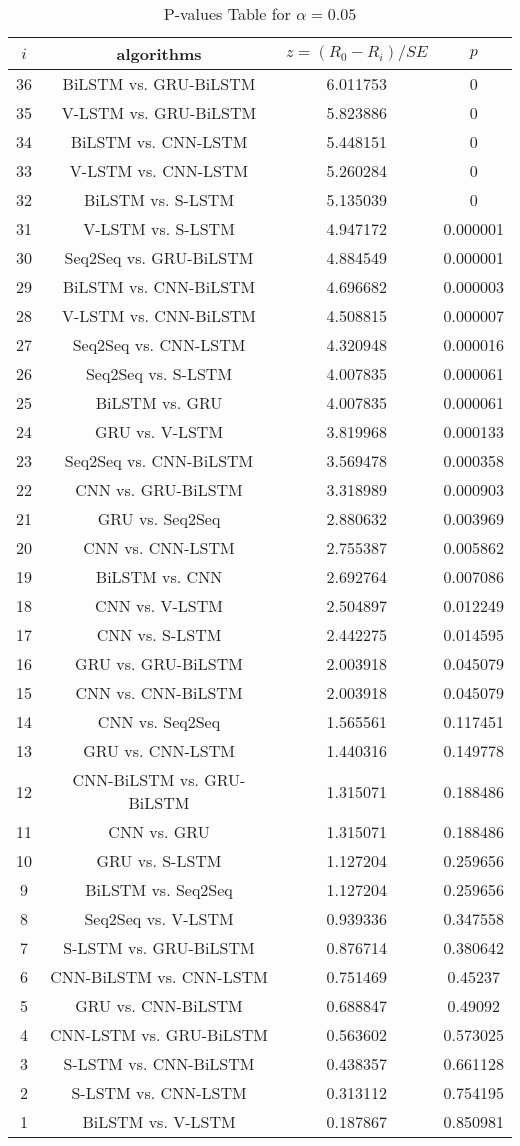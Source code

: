 \documentclass[a4paper,10pt]{article}
\begin{document}
\begin{landscape}
\begin{table}[!htp]
\centering\scriptsize
\begin{tabular}{cccc}
$i$&algorithms&$z=(R_0 - R_i)/SE$&$p$\\
\hline36&BiLSTM vs. GRU-BiLSTM&6.011753&0\\
35&V-LSTM vs. GRU-BiLSTM&5.823886&0\\
34&BiLSTM vs. CNN-LSTM&5.448151&0\\
33&V-LSTM vs. CNN-LSTM&5.260284&0\\
32&BiLSTM vs. S-LSTM&5.135039&0\\
31&V-LSTM vs. S-LSTM&4.947172&0.000001\\
30&Seq2Seq vs. GRU-BiLSTM&4.884549&0.000001\\
29&BiLSTM vs. CNN-BiLSTM&4.696682&0.000003\\
28&V-LSTM vs. CNN-BiLSTM&4.508815&0.000007\\
27&Seq2Seq vs. CNN-LSTM&4.320948&0.000016\\
26&Seq2Seq vs. S-LSTM&4.007835&0.000061\\
25&BiLSTM vs. GRU&4.007835&0.000061\\
24&GRU vs. V-LSTM&3.819968&0.000133\\
23&Seq2Seq vs. CNN-BiLSTM&3.569478&0.000358\\
22&CNN vs. GRU-BiLSTM&3.318989&0.000903\\
21&GRU vs. Seq2Seq&2.880632&0.003969\\
20&CNN vs. CNN-LSTM&2.755387&0.005862\\
19&BiLSTM vs. CNN&2.692764&0.007086\\
18&CNN vs. V-LSTM&2.504897&0.012249\\
17&CNN vs. S-LSTM&2.442275&0.014595\\
16&GRU vs. GRU-BiLSTM&2.003918&0.045079\\
15&CNN vs. CNN-BiLSTM&2.003918&0.045079\\
14&CNN vs. Seq2Seq&1.565561&0.117451\\
13&GRU vs. CNN-LSTM&1.440316&0.149778\\
12&CNN-BiLSTM vs. GRU-BiLSTM&1.315071&0.188486\\
11&CNN vs. GRU&1.315071&0.188486\\
10&GRU vs. S-LSTM&1.127204&0.259656\\
9&BiLSTM vs. Seq2Seq&1.127204&0.259656\\
8&Seq2Seq vs. V-LSTM&0.939336&0.347558\\
7&S-LSTM vs. GRU-BiLSTM&0.876714&0.380642\\
6&CNN-BiLSTM vs. CNN-LSTM&0.751469&0.45237\\
5&GRU vs. CNN-BiLSTM&0.688847&0.49092\\
4&CNN-LSTM vs. GRU-BiLSTM&0.563602&0.573025\\
3&S-LSTM vs. CNN-BiLSTM&0.438357&0.661128\\
2&S-LSTM vs. CNN-LSTM&0.313112&0.754195\\
1&BiLSTM vs. V-LSTM&0.187867&0.850981\\
\hline
\end{tabular}
\caption{P-values Table for $\alpha=0.05$}
\end{table}\pagebreak


\end{landscape}
\end{document}
